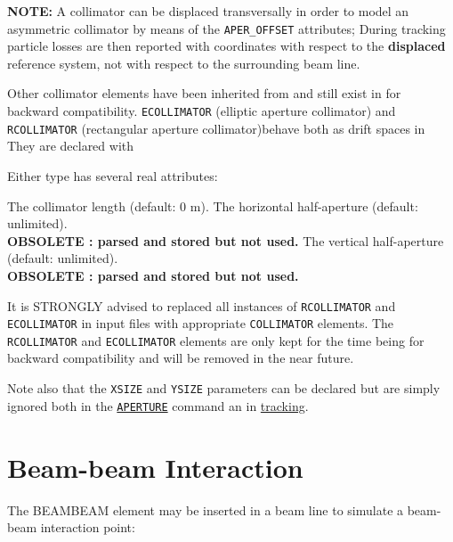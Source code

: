 {\textbf{NOTE:} A collimator can be displaced transversally in order to
model an asymmetric collimator by means of the {\tt APER\_OFFSET} attributes; 
During tracking particle losses are then reported with coordinates with respect 
to the \textbf{displaced} reference system, not with respect to the surrounding 
beam line.

Other collimator elements have been inherited from \madeight and still exist 
in \madx for backward compatibility.
{\tt ECOLLIMATOR} (elliptic aperture collimator) and {\tt RCOLLIMATOR} 
(rectangular aperture collimator)behave both as drift spaces in \madx 
They are declared with


Either type has several real attributes: 
\begin{madlist}
	 The collimator length (default: 0 m). 
	 The horizontal half-aperture (default:
	unlimited). \\ \textbf{OBSOLETE : parsed and stored but not used.} 
	 The vertical half-aperture (default:
	unlimited). \\ \textbf{OBSOLETE : parsed and stored but not used.} 
\end{madlist}

It is STRONGLY advised to replaced all instances of {\tt RCOLLIMATOR} 
and {\tt ECOLLIMATOR} in input files with appropriate {\tt COLLIMATOR} 
elements. The {\tt RCOLLIMATOR} and {\tt ECOLLIMATOR} elements are only
kept for the time being for backward compatibility and will be removed in 
the near future. 

Note also that the {\tt XSIZE} and {\tt YSIZE} parameters can be declared 
but are simply ignored both in the \hyperref[chap:aperture]{\tt APERTURE}
command an in \hyperref[chap:thintrack]{tracking}.


\section{Beam-beam Interaction}
The BEAMBEAM element may be inserted in a beam line to simulate a
beam-beam interaction point:  
 

}
